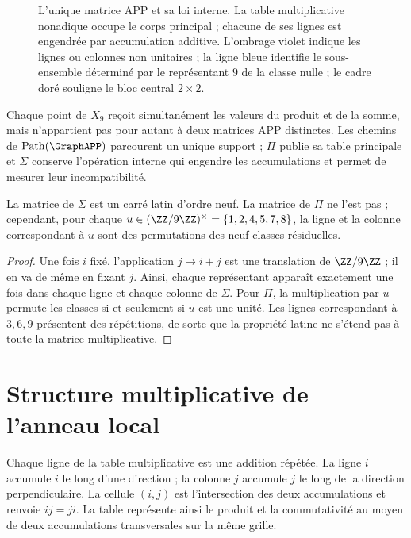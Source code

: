 \begin{figure}[H]
\centering
\resizebox{\textwidth}{!}{}
\caption{L'unique matrice APP et sa loi interne. La table multiplicative
nonadique occupe le corps principal ; chacune de ses lignes est engendrée par
accumulation additive. L'ombrage violet indique les lignes ou colonnes non
unitaires ; la ligne bleue identifie le sous-ensemble déterminé par le
représentant \(9\) de la classe nulle ; le cadre doré souligne le bloc
central \(2\times2\).}
\label{fig:app-ortograma}
\end{figure}

Chaque point de \(X_9\) reçoit simultanément les valeurs du produit et de la somme,
mais n'appartient pas pour autant à deux matrices APP distinctes. Les chemins de
\(\operatorname{Path}(\GraphAPP)\) parcourent un unique support ; \(\Pi\)
publie sa table principale et \(\Sigma\) conserve l'opération interne qui
engendre les accumulations et permet de mesurer leur incompatibilité.

\begin{proposition}
\label{prop:app-latina-unidades}
La matrice de \(\Sigma\) est un carré latin d'ordre neuf. La matrice de
\(\Pi\) ne l'est pas ; cependant, pour chaque
\(u\in(\ZZ/9\ZZ)^\times=\{1,2,4,5,7,8\}\), la ligne et la colonne
correspondant à \(u\) sont des permutations des neuf classes résiduelles.
\end{proposition}

\begin{proof}
Une fois \(i\) fixé, l'application \(j\mapsto i+j\) est une translation de
\(\ZZ/9\ZZ\) ; il en va de même en fixant \(j\). Ainsi, chaque représentant
apparaît exactement une fois dans chaque ligne et chaque colonne de \(\Sigma\). Pour
\(\Pi\), la multiplication par \(u\) permute les classes si et seulement si \(u\)
est une unité. Les lignes correspondant à \(3,6,9\) présentent des répétitions,
de sorte que la propriété latine ne s'étend pas à toute la matrice
multiplicative.
\end{proof}

\section{Structure multiplicative de l'anneau local}

Chaque ligne de la table multiplicative est une addition répétée. La ligne \(i\)
accumule \(i\) le long d'une direction ; la colonne \(j\) accumule \(j\)
le long de la direction perpendiculaire. La cellule \((i,j)\) est l'intersection
des deux accumulations et renvoie \(ij=ji\). La table représente ainsi le produit
et la commutativité au moyen de deux accumulations transversales sur la même
grille.

